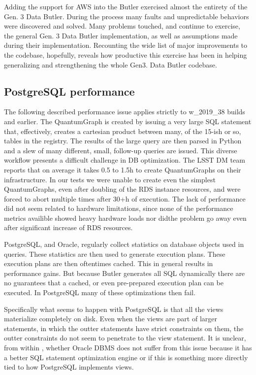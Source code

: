 Adding the support for AWS into the Butler exercised almost the entirety of the Gen. 3 Data Butler. During the process many faults and unpredictable behaviors were discovered and solved. Many problems touched, and continue to exercise, the general Gen. 3 Data Butler implementation, as well as assumptions made during their implementation. Recounting the wide list of major improvements to the codebase, hopefully, reveals how productive this exercise has been in helping generalizing and strengthening the whole Gen3. Data Butler codebase.

\subsection{PostgreSQL performance}

The following described performance issue applies strictly to w\_2019\_38 builds and earlier. The QuantumGraph is created by issuing a very large SQL statement that, effectively, creates a cartesian product between many, of the 15-ish or so, tables in the registry. The results of the large query are then parsed in Python and a slew of many different, small, follow-up queries are issued. This diverse workflow presents a difficult challenge in DB optimization. The LSST DM team reports that on average it takes 0.5 to 1.5h to create QuantumGraphs on their infrastructure. In our tests we were unable to create even the simplest QuantumGraphs, even after doubling of the RDS instance resources, and were forced to abort multiple times after 30+h of execution. The lack of performance did not seem related to hardware limitations, since none of the performance metrics availible showed heavy hardware loads nor didthe problem go away even after significant increase of RDS resources. 

PostgreSQL, and Oracle, regularly collect statistics on database objects used in queries. These statistics are then used to generate execution plans. These execution plans are then oftentimes cached. This in general results in performance gains. But because Butler generates all SQL dynamically there are no guarantees that a cached, or even pre-prepared execution plan can be executed. In PostgreSQL many of these optimizations then fail.

Specifically what seems to happen with PostgreSQL is that all the views materialize completely on disk. Even when the views are part of larger statements, in which the outter statements have strict constraints on them, the outter constraints do not seem to penetrate to the view statement. It is unclear, from within \poc, whether Oracle DBMS does not suffer from this issue because it has a better SQL statement optimization engine or if this is something more directly tied to how PostgreSQL implements views. 

